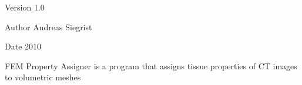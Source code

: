 \begin{DoxyVersion}{Version}
1.0 
\end{DoxyVersion}
\begin{DoxyAuthor}{Author}
Andreas Siegrist 
\end{DoxyAuthor}
\begin{DoxyDate}{Date}
2010
\end{DoxyDate}
FEM Property Assigner is a program that assigns tissue properties of CT images to volumetric meshes 